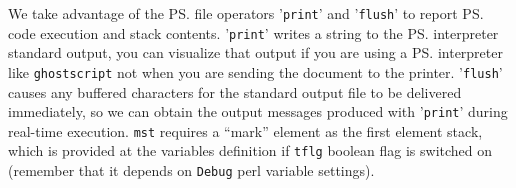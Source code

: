 \documentclass[11pt]{article}
\begin{document}

We take advantage of the {\ps} file operators '{\tt{}print}' and '{\tt{}flush}' to report {\ps} code execution and stack contents. '{\tt{}print}' writes a string to the {\ps} interpreter standard output, you can visualize that output if you are using a {\ps} interpreter like {\tt{}ghostscript} not when you are sending the document to the printer. '{\tt{}flush}' causes any buffered characters for the standard output file to be delivered immediately, so we can obtain the output messages produced with '{\tt{}print}' during real-time execution. {\tt{}\protect{}mst} requires a ``mark'' element as the first element stack, which is provided at the variables definition if {\tt{}\protect{}tflg} boolean flag is switched on (remember that it depends on {\tt{}{}Debug} perl variable settings).
\end{document}

